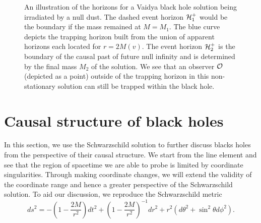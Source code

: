 \begin{figure}[!h]
\centering
{}
\caption[An illustration of the horizons for a Vaidya black hole solution being irradiated by a null dust]{An illustration of the horizons for a Vaidya black hole solution being irradiated by a null dust. The dashed event horizon ${\cal H}_1^+$ would be the boundary if the mass remained at $M = M_1$. The blue curve depicts the trapping horizon built from the union of apparent horizons each located for $r = 2M(v)$. The event horizon ${\cal H}_2^+$ is the boundary of the causal past of future null infinity and is determined by the final mass $M_2$ of the solution. We see that an observer ${\cal O}$ (depicted as a point) outside of the trapping horizon in this non-stationary solution can still be trapped within the black hole.}
\label{fig:vaidya}
\end{figure}

\section{Causal structure of black holes}
\label{sec:gencausalstructure}
In this section, we use the Schwarzschild solution to further discuss blacks holes from the perspective of their causal structure. We start from the line element  and see that the region of spacetime we are able to probe is limited by coordinate singularities. Through making coordinate changes, we will extend the validity of the coordinate range and hence a greater perspective of the Schwarzschild solution. To aid our discussion, we reproduce the Schwarzschild metric
\begin{equation*}
ds^2 = -\left(1 - \frac{2M}{r^2} \right) dt^2 +	\left(1 - \frac{2M}{r^2} \right)^{-1} dr^2 + r^2(d\theta^2 + \sin^2\theta d\phi^2).
\end{equation*}


